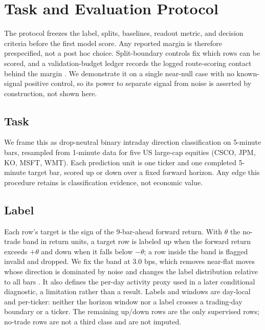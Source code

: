 \section{Task and Evaluation Protocol}\label{sec:protocol}

The protocol freezes the label, splits, baselines, readout metric, and decision
criteria before the first model score. Any reported margin is therefore prespecified, not
a post hoc choice. Split-boundary controls fix which rows can be scored, and a
validation-budget ledger records the logged route-scoring contact behind the
margin
\cite{kapoor2023leakage,lopezdeprado2018advances}. We demonstrate it on a single
near-null case with no known-signal positive control, so its power to separate
signal from noise is asserted by construction, not shown here.

\subsection{Task}

We frame this as drop-neutral binary intraday direction classification on
5-minute bars, resampled from 1-minute data for five US large-cap equities
(CSCO, JPM, KO, MSFT, WMT). Each prediction unit is one ticker and one completed
5-minute target bar, scored up or down over a fixed forward horizon. Any edge this
procedure retains is classification evidence, not economic value.

\subsection{Label}

Each row's target is the sign of the 9-bar-ahead forward return. With \(\theta\)
the no-trade band in return units, a target row is
labeled up when the forward return exceeds \(+\theta\) and down when it falls
below \(-\theta\); a row inside the band is flagged invalid and dropped. We fix
the band at \(3.0\) bps, which removes
near-flat moves whose direction is dominated by noise
\cite{xu2018stock,sun2017predicting} and changes the label distribution relative
to all bars \cite{zadrozny2004learning}. It also defines the per-day activity
proxy used in a later conditional diagnostic, a limitation rather than a result.
Labels and windows are day-local and per-ticker: neither the horizon window nor a
label crosses a trading-day boundary or a ticker. The remaining up/down rows are
the only supervised rows; no-trade rows are not a third class and are not imputed.

